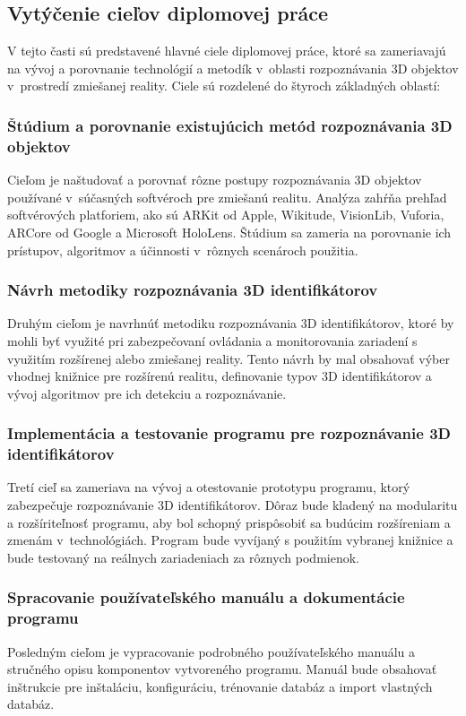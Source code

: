 
\subsection{Vytýčenie cieľov diplomovej práce}
V tejto časti sú predstavené hlavné ciele diplomovej práce, ktoré sa zameriavajú na vývoj a porovnanie technológií a metodík v~oblasti rozpoznávania 3D objektov v~prostredí zmiešanej reality. Ciele sú rozdelené do štyroch základných oblastí:

\subsubsection{Štúdium a porovnanie existujúcich metód rozpoznávania 3D objektov}
Cieľom je naštudovať a porovnať rôzne postupy rozpoznávania 3D objektov používané v~súčasných softvéroch pre zmiešanú realitu. Analýza zahŕňa prehľad softvérových platforiem, ako sú ARKit od Apple, Wikitude, VisionLib, Vuforia, ARCore od Google a Microsoft HoloLens. Štúdium sa zameria na porovnanie ich prístupov, algoritmov a účinnosti v~rôznych scenároch použitia.

\subsubsection{Návrh metodiky rozpoznávania 3D identifikátorov}
Druhým cieľom je navrhnúť metodiku rozpoznávania 3D identifikátorov, ktoré by mohli byť využité pri zabezpečovaní ovládania a monitorovania zariadení s využitím rozšírenej alebo zmiešanej reality. Tento návrh by mal obsahovať výber vhodnej knižnice pre rozšírenú realitu, definovanie typov 3D identifikátorov a vývoj algoritmov pre ich detekciu a rozpoznávanie.

\subsubsection{Implementácia a testovanie programu pre rozpoznávanie 3D identifikátorov}
Tretí cieľ sa zameriava na vývoj a otestovanie prototypu programu, ktorý zabezpečuje rozpoznávanie 3D identifikátorov. Dôraz bude kladený na modularitu a rozšíriteľnosť programu, aby bol schopný prispôsobiť sa budúcim rozšíreniam a zmenám v~technológiách. Program bude vyvíjaný s použitím vybranej knižnice a bude testovaný na reálnych zariadeniach za rôznych podmienok.

\subsubsection{Spracovanie používateľského manuálu a dokumentácie programu}
Posledným cieľom je vypracovanie podrobného používateľského manuálu a stručného opisu komponentov vytvoreného programu. Manuál bude obsahovať inštrukcie pre inštaláciu, konfiguráciu, trénovanie databáz a import vlastných databáz.

